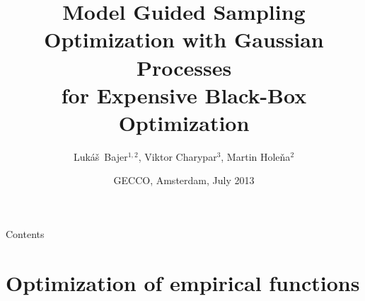 \documentclass[sans,mathserif]{beamer}
\title[MGSO with Gaussian Processes for Black-Box Opt.
  \hspace{4em}\insertframenumber] %
  {Model Guided Sampling Optimization with Gaussian Processes \\ for Expensive Black-Box Optimization}
\author[Luk\'{a}\v{s} Bajer, Viktor Charypar, Martin Hole\v{n}a]
{Luk\'{a}\v{s}~Bajer$^{1,2}$, Viktor Charypar$^3$, Martin Hole\v{n}a$^2$}
\institute[MFF UK, UI AVČR, FJFI ČVUT] %
{
  $^1$Faculty of Mathematics and Physics, Charles University, \\
  $^2$Institute of Computer Science, Czech Academy of Sciences, and \\
  $^3$Faculty of Nuclear Sciences, Czech Technical University
\vskip 1em
  Prague, Czech Republic
}
\date{GECCO, Amsterdam, July 2013}
\begin{document}
\begin{frame}
  \titlepage
\end{frame}

\begin{frame}{Contents}
  \tableofcontents
\end{frame}





\section{Optimization of empirical functions}
\end{document}
